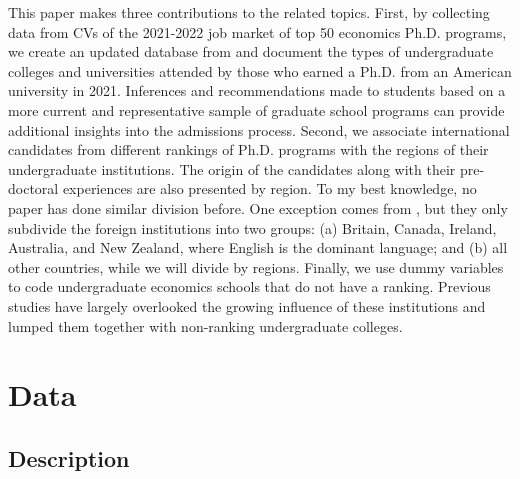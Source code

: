 \documentclass[12pt]{article}
\begin{document}
This paper makes three contributions to the related topics. First, by collecting data from CVs of the 2021-2022 job market of top 50 economics Ph.D. programs, we create an updated database from \citet{pathtoeconphd} and document the types of undergraduate colleges and universities attended by those who earned a Ph.D. from an American university in 2021. Inferences and recommendations made to students based on a more current and representative sample of graduate school programs can provide additional insights into the admissions process. Second, we associate international candidates from different rankings of Ph.D. programs with the regions of their undergraduate institutions. The origin of the candidates along with their pre-doctoral experiences are also presented by region. To my best knowledge, no paper has done similar division before. One exception comes from \citet{stock2007}, but they only subdivide the foreign institutions into two groups: (a) Britain, Canada, Ireland, Australia, and New Zealand, where English is the dominant language; and (b) all other countries, while we will divide by regions. Finally, we use dummy variables to code undergraduate economics schools that do not have a ranking. Previous studies have largely overlooked the growing influence of these institutions and lumped them together with non-ranking undergraduate colleges.

\section{Data \label{sec:data}}
\subsection{Description}
\end{document}
